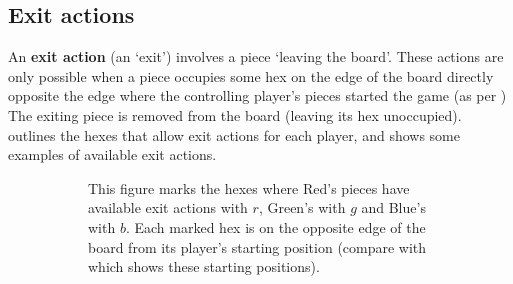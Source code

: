 \documentclass[]{article}
\newcommand{\piece}[4] {
    \node[draw,circle,minimum size=6.8mm,fill=white] at ({#1}, {#2}) {};
    \node[draw,circle,minimum size=5.8mm,very thick,{#3}] at ({#1}, {#2}) {};
    \node[] at ({#1}, {#2}) {${#4}$};
}
\newcommand{\hex}[4] {
    \node[hex,fill={#3}] at ({#1}, {#2}) {};
    \node[hex,thick,draw={#3},fill={#3!10}] at ({#1}, {#2}) {};
    \node at ({#1}, {#2}) {{#4}};
}
\newcommand{\board} {
    \tikzset{
        hex/.style={
            regular polygon,
            regular polygon sides=6,
            minimum size=10mm,
            inner sep=0mm,
            outer sep=0mm,
            rotate=30,
            draw
        },
        x={(4.33mm,7.5mm)},
        y={(8.66mm,0mm)}
    }
    \foreach \r/\q in {
                 +3/-3,+3/-2,+3/-1,+3/+0,
              +2/-3,+2/-2,+2/-1,+2/+0,+2/+1,
           +1/-3,+1/-2,+1/-1,+1/+0,+1/+1,+1/+2,
        +0/-3,+0/-2,+0/-1,+0/+0,+0/+1,+0/+2,+0/+3,
           -1/-2,-1/-1,-1/+0,-1/+1,-1/+2,-1/+3,
              -2/-1,-2/+0,-2/+1,-2/+2,-2/+3,
                 -3/+0,-3/+1,-3/+2,-3/+3,
    }
        \node[hex,fill=black!5] at (\r, \q) {};
}
\begin{document}
\subsection*{Exit actions}

An \textbf{exit action} (an `exit') involves a piece `leaving the
board'. These actions are only possible when a piece occupies some hex
on the edge of the board directly opposite the edge where the
controlling player's pieces started the game (as per ) The
exiting piece is removed from the board (leaving its hex unoccupied).
 outlines the hexes that allow exit actions for each player,
and shows some examples of available exit actions.

\begin{figure}[ht!]
\centering
\begin{subfigure}{.35\textwidth}
    \centering
    \caption{\label{fig:exits}
        This figure marks the hexes where Red's pieces have available exit
        actions with $r$, Green's with $g$ and Blue's with $b$. Each
        marked hex is on the opposite edge of the board from its player's
        starting position (compare with  which shows these
        starting positions).
    }
\end{subfigure}
\begin{subfigure}{.01\textwidth}
\phantom{SP}
\end{subfigure}
\begin{subfigure}{.62\textwidth}
    \centering
\end{subfigure}
\end{figure}
\end{document}
